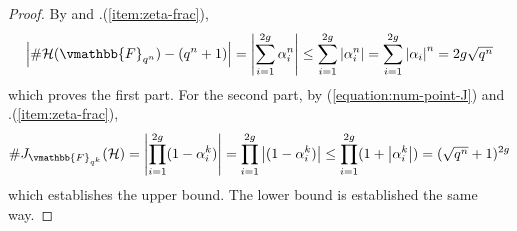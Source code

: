 \begin{proof}
By  and .(\ref{item:zeta-frac}), 
$$
\abs{\#\mathcal{H}(\vmathbb{F}_{q^n}) - (q^n + 1)} = \abs{\sum_{i = 1}^{2g} \alpha_i^n} \le \sum_{i = 
1}^{2g} \abs{\alpha_i^n} = \sum_{i = 1}^{2g} \abs{\alpha_i}^n = 2g\sqrt{q^n}
$$
which proves the first part. For the second part, by (\ref{equation:num-point-J}) and 
.(\ref{item:zeta-frac}),
$$
\#J_{\vmathbb{F}_{q^k}}(\mathcal{H}) = \abs{\prod_{i = 1}^{2g} (1 - \alpha_i^k)} = \prod_{i = 1}^{2g} 
\abs{(1 - \alpha_i^k)} \le \prod_{i = 1}^{2g} (1 + \abs{\alpha_i^k}) = (\sqrt{q^n} + 1)^{2g}
$$
which establishes the upper bound. The lower bound is established the same way. 
\end{proof}